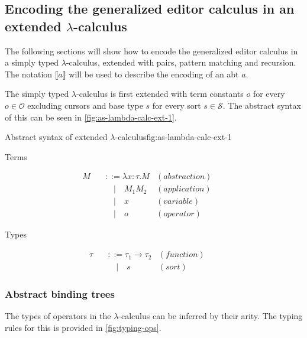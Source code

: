 \subsection{Encoding the generalized editor calculus in an extended $\lambda$-calculus}
The following sections will show how to encode the generalized editor calculus in a simply typed $\lambda$-calculus, extended with pairs, pattern matching and recursion. The notation $\llbracket a \rrbracket$ will be used to describe the encoding of an abt $a$.

The simply typed $\lambda$-calculus is first extended with term constants $o$ for every $o \in \mathcal{O}$ excluding cursors and base type $s$ for every sort $s \in \mathcal{S}$. The abstract syntax of this can be seen in \cref{fig:as-lambda-calc-ext-1}.

\begin{myfigure}{Abstract syntax of extended $\lambda$-calculus}{fig:as-lambda-calc-ext-1}
    \begin{center}
        Terms
    \end{center}
    \[
        \begin{aligned}
            M \quad & ::= \lambda x : \tau.M & (abstraction) &  & \\
                    & \quad | \quad M_1 M_2  & (application) &  & \\
                    & \quad | \quad x        & (variable)    &  & \\
                    & \quad | \quad o        & (operator)
        \end{aligned}
    \]

    \begin{center}
        Types
    \end{center}
    \[
        \begin{aligned}
            \tau \quad & ::= \tau_1 \rightarrow \tau_2 & (function) &  & \\
                       & \quad | \quad s               & (sort)
        \end{aligned}
    \]
\end{myfigure}

\subsubsection{Abstract binding trees}

The types of operators in the $\lambda$-calculus can be inferred by their arity. The typing rules for this is provided in \cref{fig:typing-ops}.

